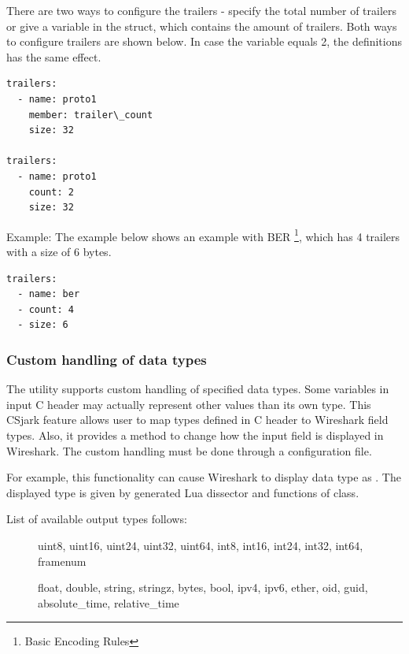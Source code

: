 \documentclass[A4paper,10pt,english]{sphinxmanual}
\begin{document}
There are two ways to configure the trailers - specify the total number of trailers or give a variable in the struct, which contains the amount of trailers. Both ways to configure trailers are shown below. In case the variable  equals 2, the definitions has the same effect.

\begin{Verbatim}[commandchars=\\\{\}]
trailers:
  - name: proto1
    member: trailer\_count
    size: 32

trailers:
  - name: proto1
    count: 2
    size: 32
\end{Verbatim}

Example:
The example below shows an example with BER \footnote{
Basic Encoding Rules
}, which has 4 trailers with a size of 6 bytes.

\begin{Verbatim}[commandchars=\\\{\}]
trailers:
  - name: ber
  - count: 4
  - size: 6
\end{Verbatim}


\subsubsection{Custom handling of data types}
\label{user/config:custom-handling-of-data-types}
The utility supports custom handling of specified data types. Some variables in input C header may actually represent other values than its own type. This CSjark feature allows user to map types defined in C header to Wireshark field types. Also, it provides a method to change how the input field is displayed in Wireshark. The custom handling must be done through a configuration file.

For example, this functionality can cause Wireshark to display  data type as . The displayed type is given by generated Lua dissector and functions of  class.

List of available output types follows:
\begin{description}
\item[{}] \leavevmode
uint8, uint16, uint24, uint32, uint64, int8, int16, int24, int32, int64, framenum

\item[{}] \leavevmode
float, double, string, stringz, bytes, bool, ipv4, ipv6, ether, oid, guid, absolute\_time, relative\_time

\end{description}
\end{document}

